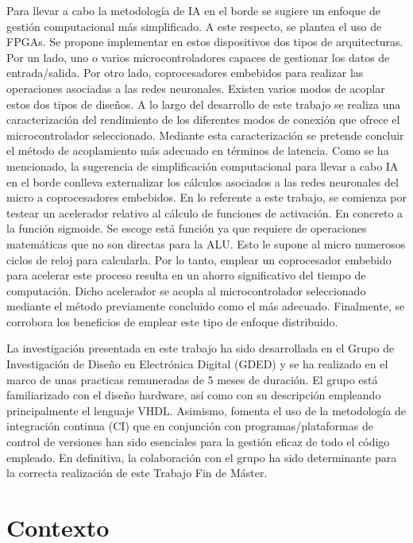 Para llevar a cabo la metodología de IA en el borde se sugiere un enfoque de gestión computacional más simplificado.
A este respecto, se plantea el uso de FPGAs.
Se propone implementar en estos dispositivos dos tipos de arquitecturas.
Por un lado, uno o varios microcontroladores capaces de gestionar los datos de entrada/salida. 
Por otro lado, coprocesadores embebidos para realizar las operaciones asociadas a las redes neuronales. 
Existen varios modos de acoplar estos dos tipos de diseños.
A lo largo del desarrollo de este trabajo se realiza una caracterización del rendimiento de los diferentes modos de conexión que ofrece el microcontrolador seleccionado.
Mediante esta caracterización se pretende concluir el método de acoplamiento más adecuado en términos de latencia.
Como se ha mencionado, la sugerencia de simplificación computacional para llevar a cabo IA en el borde conlleva externalizar los cálculos asociados a las redes neuronales del micro a coprocesadores embebidos.
En lo referente a este trabajo, se comienza por testear un acelerador relativo al cálculo de funciones de activación.
En concreto a la función sigmoide.
Se escoge está función ya que requiere de operaciones matemáticas que no son directas para la ALU.
Esto le supone al micro numerosos ciclos de reloj para calcularla. 
Por lo tanto, emplear un coprocesador embebido para acelerar este proceso resulta en un ahorro significativo del tiempo de computación.
Dicho acelerador se acopla al microcontrolador seleccionado mediante el método previamente concluido como el más adecuado. 
Finalmente, se corrobora los beneficios de emplear este tipo de enfoque distribuido.

La investigación presentada en este trabajo ha sido desarrollada en el Grupo de Investigación de Diseño en Electrónica Digital (GDED) y se ha realizado en el marco de unas practicas remuneradas de 5 meses de duración.
El grupo está familiarizado con el diseño hardware, así como con su descripción empleando principalmente el lenguaje VHDL. 
Asimismo, fomenta el uso de la metodología de integración continua (CI) que en conjunción con programas/plataformas de control de versiones han sido esenciales para la gestión eficaz de todo el código empleado.
En definitiva, la colaboración con el grupo ha sido determinante para la correcta realización de este Trabajo Fin de Máster.

\section{Contexto}

